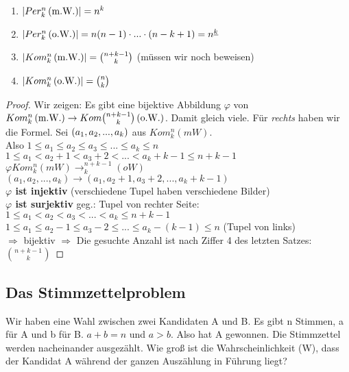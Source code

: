 \renewcommand{\ldate}{2015-10-20}

\begin{satz}
\begin{enumerate}
\item $ \left\vert Per_k^n  \left( \textrm{m.W.} \right)  \right\vert  = n^k $
\item $ \left\vert Per_k^n  \left( \textrm{o.W.} \right)  \right\vert  = n(n-1)\cdot ...\cdot (n-k+1) = n^{\underline{k}} $
\item $ \left\vert Kom_k^n  \left( \textrm{m.W.} \right)  \right\vert  = \binom{n+k-1}{k} $ (müssen wir noch beweisen)
\item $ \left\vert Kom_k^n  \left( \textrm{o.W.} \right)  \right\vert  = \binom n k $
\end{enumerate}
\end{satz}

\begin{proof}
Wir zeigen: Es gibt eine bijektive Abbildung $\varphi$ von $Kom_k^n  \left( \textrm{m.W.} \right)  \rightarrow Kom\binom{n+k-1}{k}  \left( \textrm{o.W.} \right) $. 
Damit gleich viele. Für \textit{rechts} haben wir die Formel. Sei $ \left( a_1,a_2, ..., a_k \right) $ aus $Kom_k^n(mW)$.\\
Also $1\leq a_1\leq a_2\leq a_3\leq ...\leq a_k\leq n$\\
$1\leq a_1 < a_2+1 < a_3+2 < ... < a_k + k -1 \leq n+k-1$\\
$\varphi Kom_k^n(mW) \rightarrow_k^{n+k-1}(oW)$\\
$(a_1,a_2,...,a_k) \rightarrow (a_1, a_2+1, a_3+2,...,a_k+k-1)$\\
\textbf{$\varphi $ ist injektiv} (verschiedene Tupel haben verschiedene Bilder)\\
\textbf{$\varphi $ ist surjektiv} geg.: Tupel von rechter Seite: 
$1 \leq a_1 < a_2 < a_3 < ... < a_k \leq n+k-1$\\
$1 \leq a_1 \leq a_2 - 1 \leq a_3 - 2 \leq ... \leq a_k - (k-1) \leq n $ (Tupel von links)\\
$\Rightarrow $ bijektiv $\Rightarrow $ Die gesuchte Anzahl ist nach Ziffer 4 des letzten Satzes: $\binom{n+k-1}{k}$
\end{proof}

\subsection{Das Stimmzettelproblem}
Wir haben eine Wahl zwischen zwei Kandidaten A und B. Es gibt n Stimmen, a für A und b für B. $a+b=n$ und $a > b$. Also hat A gewonnen. Die Stimmzettel werden nacheinander ausgezählt. Wie groß ist die Wahrscheinlichkeit (W), dass der Kandidat A während der ganzen Auszählung in Führung liegt?\\

